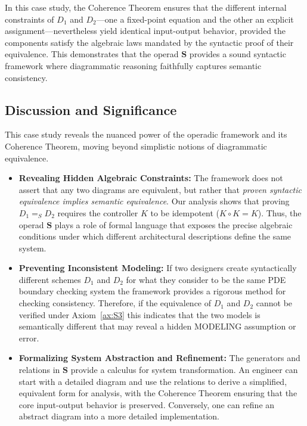 \documentclass[11pt]{article}
\begin{document}
In this case study, the Coherence Theorem ensures that the different internal constraints of $D_1$ and $D_2$—one a fixed-point equation and the other an explicit assignment—nevertheless yield identical input-output behavior, provided the components satisfy the algebraic laws mandated by the syntactic proof of their equivalence. This demonstrates that the operad $\mathbf{S}$ provides a sound syntactic framework where diagrammatic reasoning faithfully captures semantic consistency.

\subsection{Discussion and Significance}

This case study reveals the nuanced power of the operadic framework and its Coherence Theorem, moving beyond simplistic notions of diagrammatic equivalence.

\begin{itemize}
    \item \textbf{Revealing Hidden Algebraic Constraints:} The framework does not assert that any two diagrams are equivalent, but rather that \textit{proven syntactic equivalence implies semantic equivalence}. Our analysis shows that proving $D_1 =_S D_2$ requires the controller $K$ to be idempotent ($K \circ K = K$). Thus, the operad $\mathbf{S}$ plays a role of formal language that exposes the precise algebraic conditions under which different architectural descriptions define the same system.

    \item \textbf{Preventing Inconsistent Modeling:} If two designers create syntactically different schemes $D_1$ and $D_2$ for what they consider to be the same PDE boundary checking system the framework provides a rigorous method for checking consistency.  Therefore, if the equivalence of $D_1$ and $D_2$ cannot be verified under Axiom~\ref{ax:S3} this indicates that the two models is semantically different that may reveal a hidden MODELING assumption or error.
    
    
    \item \textbf{Formalizing System Abstraction and Refinement:} The generators and relations in $\mathbf{S}$ provide a calculus for system transformation. An engineer can start with a detailed diagram and use the relations to derive a simplified, equivalent form for analysis, with the Coherence Theorem ensuring that the core input-output behavior is preserved. Conversely, one can refine an abstract diagram into a more detailed implementation.
\end{itemize}
\end{document}
